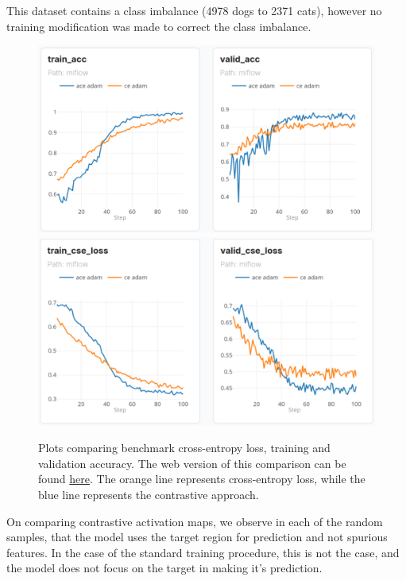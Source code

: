 \documentclass{article}
\theoremstyle{plain}
\theoremstyle{definition}
\theoremstyle{remark}
\begin{document}
This dataset contains a class imbalance (4978 dogs to 2371 cats), however no training modification was made to correct the class imbalance.

\begin{figure}[H]
	\centering
	\includegraphics[width=.4\textwidth]{img/accuracy.png}
	\hspace{4em}
	\includegraphics[width=.4\textwidth]{img/loss.png}
	\caption{Plots comparing benchmark cross-entropy loss, training and validation accuracy. The web version of this comparison can be found \href{https://dagshub.com/jinensetpal/contrastive-optimization/experiments\#/compare?experiments=[\%22m_cea5cf4fcbbb4c3f984b2396927cf80c\%22,\%22m_101287828f604122a092a2501ec3facb\%22]}{here}. The orange line represents cross-entropy loss, while the blue line represents the contrastive approach.}
\end{figure}

On comparing contrastive activation maps, we observe in each of the random samples, that the model uses the target region for prediction and not spurious features. In the case of the standard training procedure, this is not the case, and the model does not focus on the target in making it's prediction.
\end{document}

